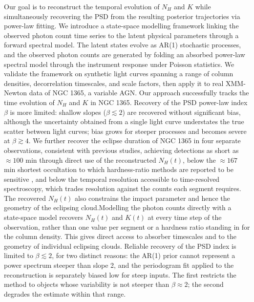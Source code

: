 \documentclass{aa}
\begin{document}
{Our goal is to reconstruct the temporal evolution of $N_H$ and $K$
while simultaneously recovering the PSD from the resulting posterior
trajectories via power-law fitting.}
{We introduce a state-space modelling framework linking the observed
photon count time series to the latent physical parameters through a
forward spectral model. The latent states evolve as AR(1) stochastic
processes, and the observed photon counts are generated by folding an
absorbed power-law spectral model through the instrument response under
Poisson statistics. We validate the framework on synthetic light curves
spanning a range of column densities, decorrelation timescales, and
scale factors, then apply it to real XMM-Newton data of NGC 1365, a
variable AGN.}
{Our approach successfully tracks the time evolution of $N_H$ and $K$ in NGC 1365. Recovery of the PSD power-law index $\beta$ is more limited: shallow slopes ($\beta \lesssim 2$) are recovered without significant bias, although the uncertainty obtained from a single light curve understates the true scatter between light curves; bias grows for steeper processes and becomes severe at $\beta \gtrsim 4$. We further recover the eclipse duration of NGC 1365 in four separate observations, consistent with previous studies, achieving detections as short as $\approx 100$ min through direct use of the reconstructed $N_H(t)$, below the $\approx 167$ min shortest occultation to which hardness-ratio methods are reported to be sensitive \citep{Pietrini2024}, and below the temporal resolution accessible to time-resolved spectroscopy, which trades resolution against the counts each segment requires. The recovered $N_H(t)$ also constrains the impact parameter and hence the geometry of the eclipsing cloud.}{{Modelling the photon counts directly with a state-space model recovers $N_H(t)$ and $K(t)$ at every time step of the observation, rather than one value per segment or a hardness ratio standing in for the column density. This gives direct access to absorber timescales and to the geometry of individual eclipsing clouds. Reliable recovery of the PSD index is limited to $\beta \lesssim 2$, for two distinct reasons: the AR(1) prior cannot represent a power spectrum steeper than slope 2, and the periodogram fit applied to the reconstruction is separately biased low for steep inputs. The first restricts the method to objects whose variability is not steeper than $\beta \approx 2$; the second degrades the estimate within that range.}}
\end{document}
